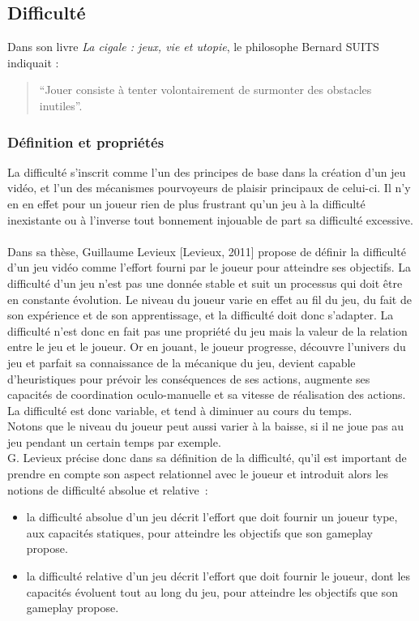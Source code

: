 \subsection{Difficulté}
Dans son livre \emph{La cigale : jeux, vie et utopie}, le philosophe Bernard SUITS indiquait : \begin{quote}{“Jouer consiste à tenter volontairement de surmonter des obstacles inutiles”}.  \end{quote}
		
	\subsubsection{Définition et propriétés}
La difficulté s’inscrit comme l’un des principes de base dans la création d’un jeu vidéo, et l’un des mécanismes pourvoyeurs de plaisir principaux de celui-ci. Il n’y en en effet pour un joueur rien de plus frustrant qu’un jeu à la difficulté inexistante ou à l’inverse tout bonnement injouable de part sa difficulté excessive. \paragraph{}

Dans sa thèse, Guillaume Levieux [Levieux, 2011]\cite{Levi11} propose de définir la difficulté d’un jeu vidéo comme l’effort fourni par le joueur pour atteindre ses objectifs. La difficulté d’un jeu n’est pas une donnée stable et suit un processus qui doit être en constante évolution. Le niveau du joueur varie en effet au fil du jeu, du fait de son expérience et de son apprentissage, et la difficulté doit donc s’adapter. 
La difficulté n’est donc en fait pas une propriété du jeu mais la valeur de la relation entre le jeu et le joueur. Or en jouant, le joueur progresse, découvre l’univers du jeu et parfait sa connaissance de la mécanique du jeu, devient capable d’heuristiques pour prévoir les conséquences de ses actions, augmente ses capacités de coordination oculo-manuelle et sa vitesse de réalisation des actions. La difficulté est donc variable, et tend à diminuer au cours du temps.\\
Notons que le niveau du joueur peut aussi varier à la baisse, si il ne joue pas au jeu pendant un certain temps par exemple. \\

G. Levieux précise donc dans sa définition de la difficulté, qu’il est important de prendre en compte son aspect relationnel avec le joueur et introduit alors les notions de difficulté absolue et relative~:
	\begin{itemize}
		\item la difficulté absolue d’un jeu décrit l’effort que doit fournir un joueur type, aux capacités statiques, pour atteindre les objectifs que son gameplay propose. 
		\item la difficulté relative d’un jeu décrit l’effort que doit fournir le joueur, dont les capacités évoluent tout au long du jeu, pour atteindre les objectifs que son gameplay propose.
	\end{itemize}
